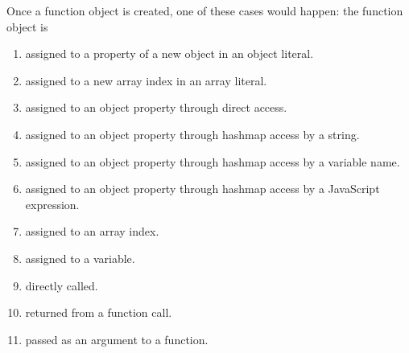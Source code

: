 \documentclass{acm_proc_article-sp}
\begin{document}
    
Once a function object is created, one of these cases would happen: the function object is
    \begin{enumerate}
		\item assigned to a property of a new object in an object literal.
		\item assigned to a new array index in an array literal.
		\item assigned to an object property through direct access.
		\item assigned to an object property through hashmap access by a string.
		\item assigned to an object property through hashmap access by a variable name.
		\item assigned to an object property through hashmap access by a JavaScript expression.
		\item assigned to an array index.
		\item assigned to a variable.
		\item directly called.
		\item returned from a function call.
		\item passed as an argument to a function.
		\end{enumerate}
   
\end{document}
